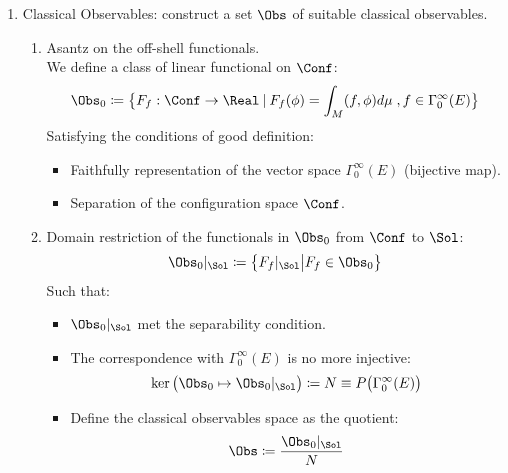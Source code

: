 \documentclass[Main]{subfiles}
\begin{document}
\begin{enumerate}
\begin{enumerate}
   				\item Classical Observables: construct a set $\Obs$ of suitable classical observables.
   				   	\begin{enumerate}
   						\item Asantz on the off-shell functionals.\\
   							We define a class of linear functional on $\Conf$:
   							\begin{displaymath}
   								\Obs_0 \coloneqq \big\{ F_f: \Conf \rightarrow \Real \:\vert
   								\: F_f(\phi)=\int_M ( f, \phi) d\mu \; , f \in \Gamma_0^\infty(E)	\big\}
   							\end{displaymath}
   							Satisfying the conditions of good definition:
   							\begin{itemize}
   								\item Faithfully representation of the vector space $\Gamma_0^\infty(E)$ (bijective map).
   								\item Separation of the configuration space $\Conf$.   								
   							\end{itemize}
   						\item Domain restriction of the functionals in $\Obs_0$ from $\Conf$ to $\Sol$:
   							\begin{displaymath}
   								\Obs_0\vert_\Sol \coloneqq \big\{F_f\vert_\Sol \big \vert F_f \in \Obs_0 \big\}
   							\end{displaymath}
   							Such that: 
   							\begin{itemize}
   								\item $\Obs_0\vert_\Sol$ met the separability condition.
   								\item The correspondence with  $\Gamma_0^\infty(E)$ is no more injective:
   									\begin{displaymath}
   										\ker \big( \Obs_0 \mapsto \Obs_0\vert_\Sol \big) \coloneqq N \equiv P \big( \Gamma_0^\infty (E) \big)
   									\end{displaymath}
   								\item Define the classical observables space as the quotient:
   									\begin{displaymath}
   										\Obs \coloneqq \frac{\Obs_0\vert_\Sol}{N}
   									\end{displaymath}
   							\end{itemize}   							 
   					\end{enumerate}
   				 

\end{enumerate}
\end{enumerate}
\end{document}
